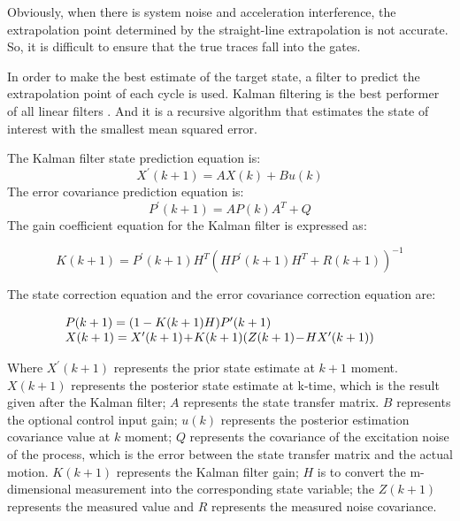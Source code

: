 \documentclass[default,iicol]{sn-jnl}%
\theoremstyle{thmstyleone}%
\theoremstyle{thmstyletwo}%
\theoremstyle{thmstylethree}%
\begin{document}
Obviously, when there is system noise and acceleration interference, the extrapolation point determined by the straight-line extrapolation is not accurate. So, it is difficult to ensure that the true traces fall into the gates.

In order to make the best estimate of the target state, a filter to predict the extrapolation point of each cycle is used. Kalman filtering is the best performer of all linear filters \cite{bib17}. And it is a recursive algorithm that estimates the state of interest with the smallest mean squared error.

The Kalman filter state prediction equation is:
\begin{equation}
    X ^ { \prime } ( k + 1 ) = A X ( k ) + B u ( k )
    \label{eq7}
\end{equation}
The error covariance prediction equation is:
\begin{equation}
    P ^ { \prime } ( k + 1 ) = A P ( k ) A ^ { T } + Q
    \label{eq8}
\end{equation}
The gain coefficient equation for the Kalman filter is expressed as:
\begin{footnotesize}
    \begin{equation}
        K ( k + 1 ) = P ^ { \prime } ( k + 1 ) H ^ { T } ( H P ^ { \prime } ( k + 1 ) H ^ { T } + R ( k + 1 ) ) ^ { - 1 }
        \label{eq9}
    \end{equation}
\end{footnotesize}
The state correction equation and the error covariance correction equation are:
\begin{footnotesize}
    \begin{equation}
        \hspace{-6mm}
        \left. \begin{array}  { l  }  { P ( k + 1 ) = ( 1 - K ( k + 1 ) H ) P ^ { \prime } ( k + 1 ) } \\ { X ( k + 1 ) = X ^ { \prime } ( k + 1 )\! +\! K ( k + 1 ) ( Z ( k + 1 ) \!- \!H X ^ { \prime } ( k + 1 ) ) } \end{array} \right.\!
        \label{eq10}
    \end{equation}
\end{footnotesize}
Where $X ^ { \prime } ( k + 1 )$ represents the prior state estimate at $k+1$ moment. $X(k+1)$ represents the posterior state estimate at k-time, which is the result given after the Kalman filter; $A$ represents the state transfer matrix. $B$ represents the optional control input gain; $u(k)$ represents the posterior estimation covariance value at $k$ moment; $Q$ represents the covariance of the excitation noise of the process, which is the error between the state transfer matrix and the actual motion. $K(k+1)$ represents the Kalman filter gain; $H$ is to convert the m-dimensional measurement into the corresponding state variable; the $Z(k+1)$ represents the measured value and $R$ represents the measured noise covariance.
\end{document}
